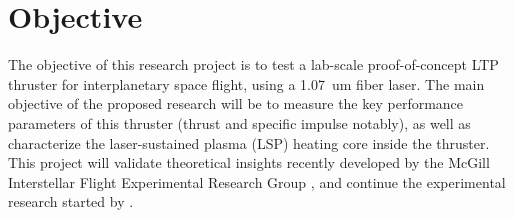 
        \section{Objective}

            The objective of this research project is to test a lab-scale proof-of-concept LTP thruster for interplanetary space flight, using a \qty{1.07}{um} fiber laser. The main objective of the proposed research will be to measure the key performance parameters of this thruster (thrust and specific impulse notably), as well as characterize the laser-sustained plasma (LSP) heating core inside the thruster. This project will validate theoretical insights recently developed by the McGill Interstellar Flight Experimental Research Group \cite{baoTwoDimensionalSimulationLaser}, \cite{duplayDesignRapidTransit2022a} and continue the experimental research started by \textcite{duplayArgonLaserPlasmaThruster2024a}. %

